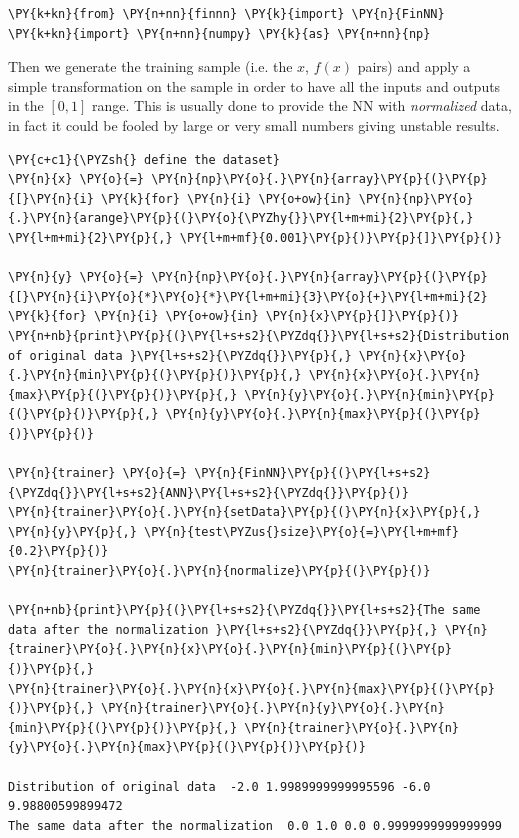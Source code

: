 \begin{tcolorbox}[breakable, size=fbox, boxrule=1pt, pad at break*=1mm,colback=cellbackground, colframe=cellborder]
\begin{Verbatim}[commandchars=\\\{\}]
\PY{k+kn}{from} \PY{n+nn}{finnn} \PY{k}{import} \PY{n}{FinNN}
\PY{k+kn}{import} \PY{n+nn}{numpy} \PY{k}{as} \PY{n+nn}{np}
\end{Verbatim}
\end{tcolorbox}

Then we generate the training sample (i.e. the \(x\), \(f(x)\) pairs)
and apply a simple transformation on the sample in order to have all the
inputs and outputs in the \([0, 1]\) range. This is usually done to
provide the NN with \emph{normalized} data, in fact it could be fooled
by large or very small numbers giving unstable results.

\begin{tcolorbox}[breakable, size=fbox, boxrule=1pt, pad at break*=1mm,colback=cellbackground, colframe=cellborder]
\begin{Verbatim}[commandchars=\\\{\}]
\PY{c+c1}{\PYZsh{} define the dataset}
\PY{n}{x} \PY{o}{=} \PY{n}{np}\PY{o}{.}\PY{n}{array}\PY{p}{(}\PY{p}{[}\PY{n}{i} \PY{k}{for} \PY{n}{i} \PY{o+ow}{in} \PY{n}{np}\PY{o}{.}\PY{n}{arange}\PY{p}{(}\PY{o}{\PYZhy{}}\PY{l+m+mi}{2}\PY{p}{,} \PY{l+m+mi}{2}\PY{p}{,} \PY{l+m+mf}{0.001}\PY{p}{)}\PY{p}{]}\PY{p}{)}
	
\PY{n}{y} \PY{o}{=} \PY{n}{np}\PY{o}{.}\PY{n}{array}\PY{p}{(}\PY{p}{[}\PY{n}{i}\PY{o}{*}\PY{o}{*}\PY{l+m+mi}{3}\PY{o}{+}\PY{l+m+mi}{2} \PY{k}{for} \PY{n}{i} \PY{o+ow}{in} \PY{n}{x}\PY{p}{]}\PY{p}{)}
\PY{n+nb}{print}\PY{p}{(}\PY{l+s+s2}{\PYZdq{}}\PY{l+s+s2}{Distribution of original data }\PY{l+s+s2}{\PYZdq{}}\PY{p}{,} \PY{n}{x}\PY{o}{.}\PY{n}{min}\PY{p}{(}\PY{p}{)}\PY{p}{,} \PY{n}{x}\PY{o}{.}\PY{n}{max}\PY{p}{(}\PY{p}{)}\PY{p}{,} \PY{n}{y}\PY{o}{.}\PY{n}{min}\PY{p}{(}\PY{p}{)}\PY{p}{,} \PY{n}{y}\PY{o}{.}\PY{n}{max}\PY{p}{(}\PY{p}{)}\PY{p}{)}
	
\PY{n}{trainer} \PY{o}{=} \PY{n}{FinNN}\PY{p}{(}\PY{l+s+s2}{\PYZdq{}}\PY{l+s+s2}{ANN}\PY{l+s+s2}{\PYZdq{}}\PY{p}{)}
\PY{n}{trainer}\PY{o}{.}\PY{n}{setData}\PY{p}{(}\PY{n}{x}\PY{p}{,} \PY{n}{y}\PY{p}{,} \PY{n}{test\PYZus{}size}\PY{o}{=}\PY{l+m+mf}{0.2}\PY{p}{)}
\PY{n}{trainer}\PY{o}{.}\PY{n}{normalize}\PY{p}{(}\PY{p}{)}
	
\PY{n+nb}{print}\PY{p}{(}\PY{l+s+s2}{\PYZdq{}}\PY{l+s+s2}{The same data after the normalization }\PY{l+s+s2}{\PYZdq{}}\PY{p}{,} \PY{n}{trainer}\PY{o}{.}\PY{n}{x}\PY{o}{.}\PY{n}{min}\PY{p}{(}\PY{p}{)}\PY{p}{,} 
\PY{n}{trainer}\PY{o}{.}\PY{n}{x}\PY{o}{.}\PY{n}{max}\PY{p}{(}\PY{p}{)}\PY{p}{,} \PY{n}{trainer}\PY{o}{.}\PY{n}{y}\PY{o}{.}\PY{n}{min}\PY{p}{(}\PY{p}{)}\PY{p}{,} \PY{n}{trainer}\PY{o}{.}\PY{n}{y}\PY{o}{.}\PY{n}{max}\PY{p}{(}\PY{p}{)}\PY{p}{)}

Distribution of original data  -2.0 1.9989999999995596 -6.0 9.98800599899472
The same data after the normalization  0.0 1.0 0.0 0.9999999999999999
\end{Verbatim}
\end{tcolorbox}

